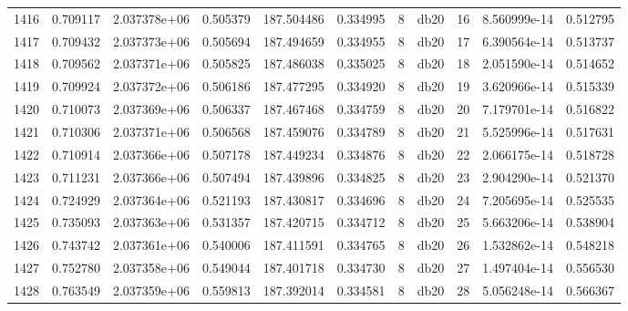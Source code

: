 \begin{tabular}{lrrrrrrlrrr}
1416 &    0.709117 &        2.037378e+06 &  0.505379 &              187.504486 &    0.334995 &       8 &         db20 &     16 &   8.560999e-14 &      0.512795 \\
1417 &    0.709432 &        2.037373e+06 &  0.505694 &              187.494659 &    0.334955 &       8 &         db20 &     17 &   6.390564e-14 &      0.513737 \\
1418 &    0.709562 &        2.037371e+06 &  0.505825 &              187.486038 &    0.335025 &       8 &         db20 &     18 &   2.051590e-14 &      0.514652 \\
1419 &    0.709924 &        2.037372e+06 &  0.506186 &              187.477295 &    0.334920 &       8 &         db20 &     19 &   3.620966e-14 &      0.515339 \\
1420 &    0.710073 &        2.037369e+06 &  0.506337 &              187.467468 &    0.334759 &       8 &         db20 &     20 &   7.179701e-14 &      0.516822 \\
1421 &    0.710306 &        2.037371e+06 &  0.506568 &              187.459076 &    0.334789 &       8 &         db20 &     21 &   5.525996e-14 &      0.517631 \\
1422 &    0.710914 &        2.037366e+06 &  0.507178 &              187.449234 &    0.334876 &       8 &         db20 &     22 &   2.066175e-14 &      0.518728 \\
1423 &    0.711231 &        2.037366e+06 &  0.507494 &              187.439896 &    0.334825 &       8 &         db20 &     23 &   2.904290e-14 &      0.521370 \\
1424 &    0.724929 &        2.037364e+06 &  0.521193 &              187.430817 &    0.334696 &       8 &         db20 &     24 &   7.205695e-14 &      0.525535 \\
1425 &    0.735093 &        2.037363e+06 &  0.531357 &              187.420715 &    0.334712 &       8 &         db20 &     25 &   5.663206e-14 &      0.538904 \\
1426 &    0.743742 &        2.037361e+06 &  0.540006 &              187.411591 &    0.334765 &       8 &         db20 &     26 &   1.532862e-14 &      0.548218 \\
1427 &    0.752780 &        2.037358e+06 &  0.549044 &              187.401718 &    0.334730 &       8 &         db20 &     27 &   1.497404e-14 &      0.556530 \\
1428 &    0.763549 &        2.037359e+06 &  0.559813 &              187.392014 &    0.334581 &       8 &         db20 &     28 &   5.056248e-14 &      0.566367 \\

\end{tabular}
